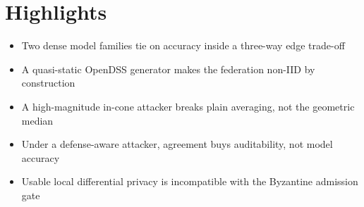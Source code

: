 \section*{Highlights}
\begin{itemize}\setlength{\itemsep}{2pt}
\item Two dense model families tie on accuracy inside a three-way edge trade-off
\item A quasi-static OpenDSS generator makes the federation non-IID by construction
\item A high-magnitude in-cone attacker breaks plain averaging, not the geometric median
\item Under a defense-aware attacker, agreement buys auditability, not model accuracy
\item Usable local differential privacy is incompatible with the Byzantine admission gate
\end{itemize}
